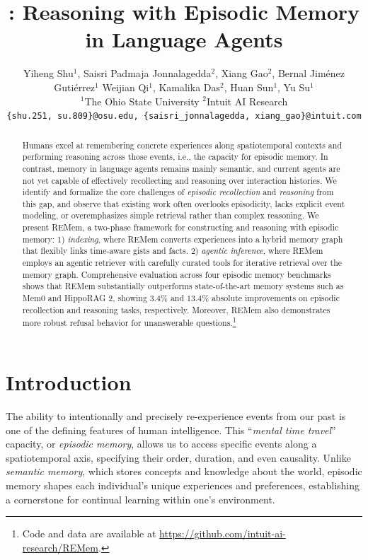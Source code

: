 \documentclass{article} %
\title{\ours: Reasoning with Episodic Memory \\in Language Agents}
\author{Yiheng Shu$^{1}$, Saisri Padmaja Jonnalagedda$^{2}$, Xiang Gao$^{2}$, Bernal Jiménez Gutiérrez$^{1}$ \AND
Weijian Qi$^{1}$, Kamalika Das$^{2}$, Huan Sun$^{1}$, Yu Su$^{1}$\\[2pt]
{\normalfont $^{1}$The Ohio State University \quad $^{2}$Intuit AI Research}\\
{\normalfont\texttt{\{shu.251, su.809\}@osu.edu, \{saisri\_jonnalagedda, xiang\_gao\}@intuit.com}}
}
\newcommand{\ours}{REMem\xspace}
\begin{document}
\maketitle

\begin{abstract}

Humans excel at remembering concrete experiences along spatiotemporal contexts and performing reasoning across those events, i.e., the capacity for episodic memory.
In contrast, memory in language agents remains mainly semantic, and current agents are not yet capable of effectively recollecting and reasoning over interaction histories.
We identify and formalize the core challenges of \textit{episodic recollection} and \textit{reasoning} from this gap, and observe that existing work often overlooks episodicity, lacks explicit event modeling, or overemphasizes simple retrieval rather than complex reasoning. 
We present \ours, a two-phase framework for constructing and reasoning with episodic memory:
1) \textit{indexing}, where \ours converts experiences into a hybrid memory graph that flexibly links time-aware gists and facts.
2) \textit{agentic inference}, where \ours employs an agentic retriever with carefully curated tools for iterative retrieval over the memory graph.
Comprehensive evaluation across four episodic memory benchmarks shows that
\ours substantially outperforms state-of-the-art memory systems such as Mem0 and HippoRAG 2, showing $3.4\%$ and $13.4\%$ absolute improvements on episodic recollection and reasoning tasks, respectively.
Moreover, \ours also demonstrates more robust refusal behavior for unanswerable questions.\footnote{Code and data are available at \url{https://github.com/intuit-ai-research/REMem}.}



\end{abstract}

\section{Introduction}


The ability to intentionally and precisely re-experience events from our past is one of the defining features of human intelligence.
This ``\textit{mental time travel}'' capacity, or \textit{episodic memory}, allows us to access specific events along a spatiotemporal axis, specifying their order, duration, and even causality. 
Unlike \textit{semantic memory}, which stores concepts and knowledge about the world, episodic memory shapes each individual's unique experiences and preferences, establishing a cornerstone for continual learning within one's environment.
\end{document}
